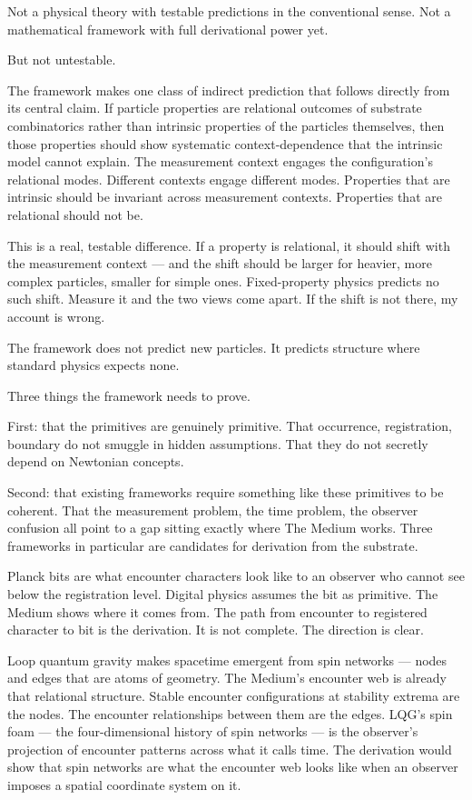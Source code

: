 \documentclass[11pt,letterpaper]{article}
\begin{document}
Not a physical theory with testable predictions in the conventional sense. Not a mathematical framework with full derivational power yet.

But not untestable.

The framework makes one class of indirect prediction that follows directly from its central claim. If particle properties are relational outcomes of substrate combinatorics rather than intrinsic properties of the particles themselves, then those properties should show systematic context-dependence that the intrinsic model cannot explain. The measurement context engages the configuration's relational modes. Different contexts engage different modes. Properties that are intrinsic should be invariant across measurement contexts. Properties that are relational should not be.

This is a real, testable difference. If a property is relational, it should shift with the measurement context --- and the shift should be larger for heavier, more complex particles, smaller for simple ones. Fixed-property physics predicts no such shift. Measure it and the two views come apart. If the shift is not there, my account is wrong.

The framework does not predict new particles. It predicts structure where standard physics expects none.

Three things the framework needs to prove.

First: that the primitives are genuinely primitive. That occurrence, registration, boundary do not smuggle in hidden assumptions. That they do not secretly depend on Newtonian concepts.

Second: that existing frameworks require something like these primitives to be coherent. That the measurement problem, the time problem, the observer confusion all point to a gap sitting exactly where The Medium works. Three frameworks in particular are candidates for derivation from the substrate.

Planck bits are what encounter characters look like to an observer who cannot see below the registration level. Digital physics assumes the bit as primitive. The Medium shows where it comes from. The path from encounter to registered character to bit is the derivation. It is not complete. The direction is clear.

Loop quantum gravity makes spacetime emergent from spin networks --- nodes and edges that are atoms of geometry. The Medium's encounter web is already that relational structure. Stable encounter configurations at stability extrema are the nodes. The encounter relationships between them are the edges. LQG's spin foam --- the four-dimensional history of spin networks --- is the observer's projection of encounter patterns across what it calls time. The derivation would show that spin networks are what the encounter web looks like when an observer imposes a spatial coordinate system on it.
\end{document}

